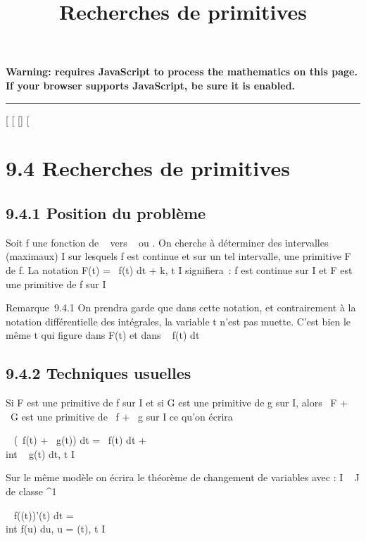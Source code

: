 \documentclass[]{article}
\title{Recherches de primitives}
\author{}
\date{}
\begin{document}
\maketitle

\textbf{Warning: 
requires JavaScript to process the mathematics on this page.\\ If your
browser supports JavaScript, be sure it is enabled.}

\begin{center}\rule{3in}{0.4pt}\end{center}

[
[
[]
[

\section{9.4 Recherches de primitives}

\subsection{9.4.1 Position du problème}

Soit f une fonction de ~ vers ~ ou . On cherche à déterminer des
intervalles (maximaux) I sur lesquels f est continue et sur un tel
intervalle, une primitive F de f. La notation F(t)
=\int ~ f(t) dt + k, t \in I signifiera~: f est
continue sur I et F est une primitive de f sur I

Remarque~9.4.1 On prendra garde que dans cette notation, et
contrairement à la notation différentielle des intégrales, la variable t
n'est pas muette. C'est bien le même t qui figure dans F(t) et dans
\int ~ f(t) dt

\subsection{9.4.2 Techniques usuelles}

Si F est une primitive de f sur I et si G est une primitive de g sur I,
alors \alpha~F + \beta~G est une primitive de \alpha~f + \beta~g sur I ce qu'on écrira

\int ~ (\alpha~f(t) + \beta~g(t)) dt =
\alpha~\int  f(t) dt + \beta~\\int ~
g(t) dt, t \in I

Sur le même modèle on écrira le théorème de changement de variables avec
\phi : I \rightarrow~ J de classe ^1

\int ~ f(\phi(t))\phi'(t) dt =\\int
 f(u) du, u = \phi(t), t \in I
\end{document}
